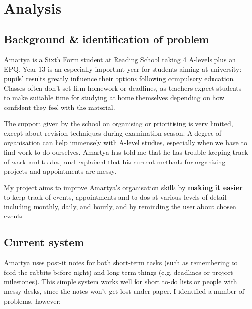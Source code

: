 \section{Analysis}

\subsection{Background \& identification of problem}

Amartya is a Sixth Form student at Reading School taking 4 A-levels plus an EPQ.
Year 13 is an especially important year for students aiming at university:
pupils' results greatly influence their options following compulsory
education. Classes often don't set firm homework or deadlines, as teachers
expect students to make suitable time for studying at home themselves depending
on how confident they feel with the material.

The support given by the school on organising or prioritising is very limited,
except about revision techniques during examination season. A degree of
organisation can help immensely with A-level studies, especially when we have to
find work to do ourselves. Amartya has told me that he has trouble keeping track
of work and to-dos, and explained that his current methods for organising
projects and appointments are messy.

My project aims to improve Amartya's organisation skills by \textbf{making it
easier} to keep track of events, appointments and to-dos at various levels of
detail including monthly, daily, and hourly, and by reminding the user about
chosen events.


\subsection{Current system}

Amartya uses post-it notes for both short-term tasks (such as remembering to
feed the rabbits before night) and long-term things (e.g. deadlines or project
milestones). This simple system works well for short to-do lists or people with
messy desks, since the notes won't get lost under paper. I identified a number
of problems, however:

